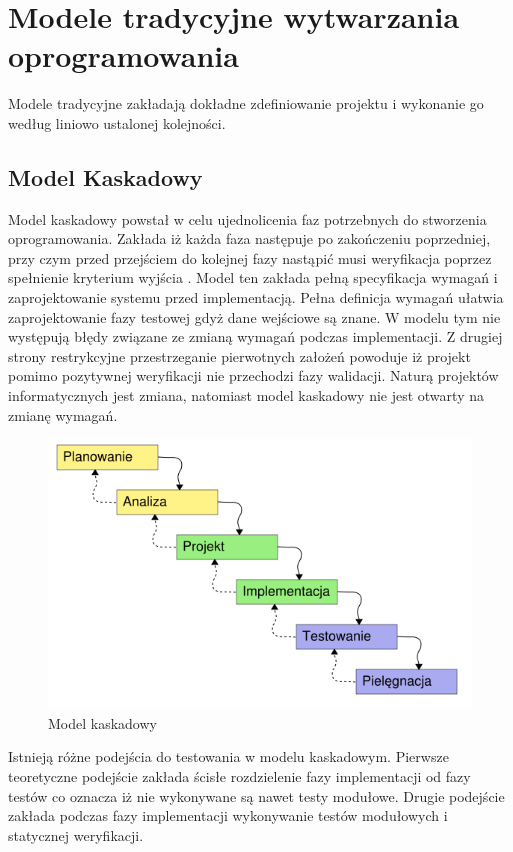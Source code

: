 \section{Modele tradycyjne wytwarzania oprogramowania}
Modele tradycyjne zakładają dokładne zdefiniowanie projektu i wykonanie go według liniowo ustalonej kolejności.
\subsection{Model Kaskadowy}
Model kaskadowy powstał w celu ujednolicenia faz potrzebnych do stworzenia oprogramowania. Zakłada iż każda faza następuje po zakończeniu poprzedniej, przy czym przed przejściem do kolejnej fazy nastąpić musi weryfikacja poprzez spełnienie kryterium wyjścia \cite{SEaT}. Model ten zakłada pełną specyfikacja wymagań i zaprojektowanie systemu przed implementacją. Pełna definicja wymagań ułatwia zaprojektowanie fazy testowej gdyż dane wejściowe są znane. W modelu tym nie występują błędy związane ze zmianą wymagań podczas implementacji. Z drugiej strony restrykcyjne przestrzeganie pierwotnych założeń powoduje iż projekt pomimo pozytywnej weryfikacji nie przechodzi fazy walidacji. Naturą projektów informatycznych jest zmiana, natomiast model kaskadowy nie jest otwarty na zmianę wymagań. 
\begin{figure}[h]
\centerline{\includegraphics[scale=0.5]{img/model_kaskadowy.png}}
\caption{Model kaskadowy}
\label{fig:kaskadowy}
\end{figure}

Istnieją różne podejścia do testowania w modelu kaskadowym. Pierwsze teoretyczne podejście zakłada ścisłe rozdzielenie fazy implementacji od fazy testów co oznacza iż nie wykonywane są nawet testy modułowe. Drugie podejście zakłada podczas fazy implementacji wykonywanie testów modułowych i statycznej weryfikacji.

